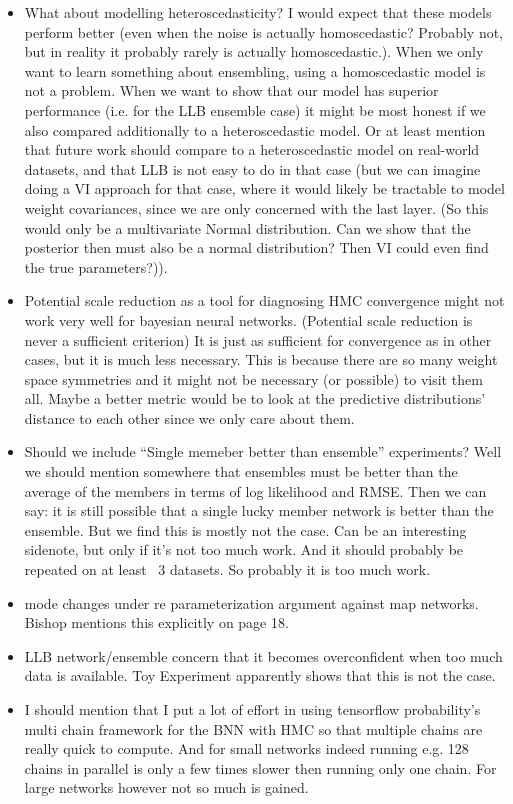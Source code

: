 \documentclass[11pt, A4, twoside]{report}
\begin{document}
\begin{itemize}
  \item What about modelling heteroscedasticity? I would expect that these models perform better (even when the noise is actually homoscedastic? Probably not, but in reality it probably rarely is actually homoscedastic.). When we only want to learn something about ensembling, using a homoscedastic model is not a problem. When we want to show that our model has superior performance (i.e. for the LLB ensemble case) it might be most honest if we also compared additionally to a heteroscedastic model. Or at least mention that future work should compare to a heteroscedastic model on real-world datasets, and that LLB is not easy to do in that case (but we can imagine doing a VI approach for that case, where it would likely be tractable to model weight covariances, since we are only concerned with the last layer. (So this would only be a multivariate Normal distribution. Can we show that the posterior then must also be a normal distribution? Then VI could even find the true parameters?)). 
  \item Potential scale reduction as a tool for diagnosing HMC convergence might not work very well for bayesian neural networks. (Potential scale reduction is never a sufficient criterion) It is just as sufficient for convergence as in other cases, but it is much less necessary. This is because there are so many weight space symmetries and it might not be necessary (or possible) to visit them all. Maybe a better metric would be to look at the predictive distributions' distance to each other since we only care about them.
  \item Should we include ``Single memeber better than ensemble'' experiments? Well we should mention somewhere that ensembles must be better than the average of the members in terms of log likelihood and RMSE. Then we can say: it is still possible that a single lucky member network is better than the ensemble. But we find this is mostly not the case. Can be an interesting sidenote, but only if it's not too much work. And it should probably be repeated on at least ~3 datasets. So probably it is too much work.
  \item mode changes under re parameterization argument against map networks. Bishop mentions this explicitly on page 18.
  \item LLB network/ensemble concern that it becomes overconfident when too much data is available. Toy Experiment apparently shows that this is not the case.
  \item I should mention that I put a lot of effort in using tensorflow probability's multi chain framework for the BNN with HMC so that multiple chains are really quick to compute. And for small networks indeed running e.g. 128 chains in parallel is only a few times slower then running only one chain.  For large networks however not so much is gained. \cite{lao2020tfp}

\end{itemize}
\end{document}
